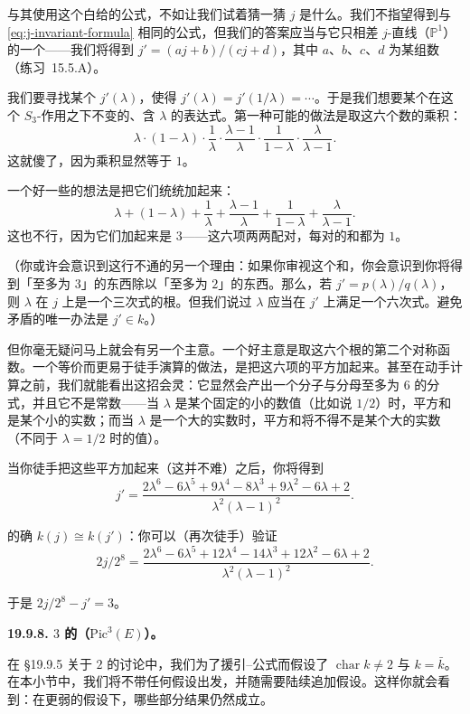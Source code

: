 与其使用这个白给的公式，不如让我们试着猜一猜 $j$ 是什么。我们不指望得到与 \eqref{eq:j-invariant-formula} 相同的公式，但我们的答案应当与它只相差 $j$-直线（$\mathbb{P}^1$）的一个\trAutomorphism——我们将得到 $j'=(aj+b)/(cj+d)$，其中 $a$、$b$、$c$、$d$ 为某组数（\mbox{练习~15.5.A}）。

我们要寻找某个 $j'(\lambda)$，使得 $j'(\lambda)=j'(1/\lambda)=\cdots$。于是我们想要某个在这个 $S_3$-作用之下不变的、含 $\lambda$ 的表达式。第一种可能的做法是取这六个数的乘积：
\[
\lambda\cdot(1-\lambda)\cdot\frac{1}{\lambda}\cdot\frac{\lambda-1}{\lambda}\cdot\frac{1}{1-\lambda}\cdot\frac{\lambda}{\lambda-1}.
\]
这就傻了，因为乘积显然等于 $1$。

一个好一些的想法是把它们统统加起来：
\[
\lambda+(1-\lambda)+\frac{1}{\lambda}+\frac{\lambda-1}{\lambda}+\frac{1}{1-\lambda}+\frac{\lambda}{\lambda-1}.
\]
这也不行，因为它们加起来是 $3$——这六项两两配对，每对的和都为 $1$。

（你或许会意识到这行不通的另一个理由：如果你审视这个和，你会意识到你将得到「\trDegree{}至多为 $3$」的东西除以「\trDegree{}至多为 $2$」的东西。那么，若 $j'=p(\lambda)/q(\lambda)$，则 $\lambda$ 在 $j$ 上是一个三次式的根。但我们说过 $\lambda$ 应当在 $j'$ 上满足一个六次式。避免矛盾的唯一办法是 $j'\in k$。）

但你毫无疑问马上就会有另一个主意。一个好主意是取这六个根的第二个对称函数。一个等价而更易于徒手演算的做法，是把这六项的平方加起来。甚至在动手计算之前，我们就能看出这招会灵：它显然会产出一个分子与分母\trDegree{}至多为 $6$ 的分式，并且它不是常数——当 $\lambda$ 是某个固定的小的数值（比如说 $1/2$）时，平方和是某个小的实数；而当 $\lambda$ 是一个大的实数时，平方和将不得不是某个大的实数（不同于 $\lambda=1/2$ 时的值）。

当你徒手把这些平方加起来（这并不难）之后，你将得到
\[
j'=\frac{2\lambda^6-6\lambda^5+9\lambda^4-8\lambda^3+9\lambda^2-6\lambda+2}{\lambda^2(\lambda-1)^2}.
\]

的确 $k(j)\cong k(j')$：你可以（再次徒手）验证
\[
2j/2^8=\frac{2\lambda^6-6\lambda^5+12\lambda^4-14\lambda^3+12\lambda^2-6\lambda+2}{\lambda^2(\lambda-1)^2}.
\]

于是 $2j/2^8-j'=3$。

\textbf{19.9.8. \trDegree{} $3$ 的\trLineBundle{}（$\mathrm{Pic}^3(E)$）。}

在 \S19.9.5 关于\trDegree{} $2$ \trLineBundle{}的讨论中，我们为了援引\trRiemann--\trHurwitz{}公式而假设了 $\operatorname{char}k\ne 2$ 与 $k=\bar{k}$。在本小节中，我们将不带任何假设出发，并随需要陆续追加假设。这样你就会看到：在更弱的假设下，哪些部分结果仍然成立。

